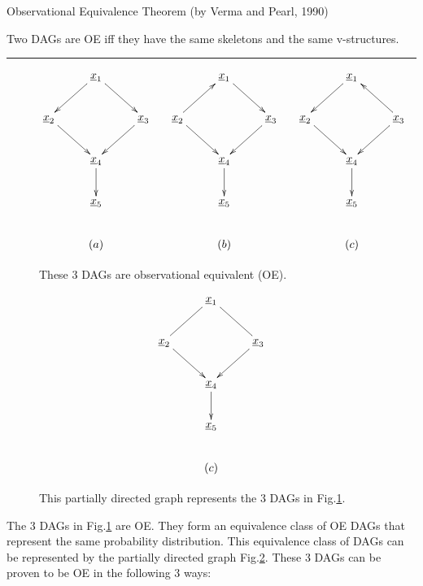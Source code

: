 \begin{claim}Observational Equivalence
Theorem (by Verma and Pearl, 1990)

Two DAGs are
OE
iff they
have the same
skeletons and
the same v-structures.
\end{claim}

\hrule{}

\begin{figure}[h!]
$$\xymatrix{
&\rvx_1
\ar[dl]
\ar[dr]
\\
\rvx_2\ar[dr]
&&\rvx_3\ar[dl]
\\
&\rvx_4\ar[d]
\\
&\rvx_5
\\
&(a)
}
\;\;\;\;\;
\xymatrix{
&\rvx_1
\ar[dr]
\\
\rvx_2\ar[dr]\ar[ur]
&&\rvx_3\ar[dl]
\\
&\rvx_4\ar[d]
\\
&\rvx_5
\\
&(b)
}
\;\;\;\;\;
\xymatrix{
&\rvx_1
\ar[dl]
\\
\rvx_2\ar[dr]
&&\rvx_3\ar[dl]\ar[ul]
\\
&\rvx_4\ar[d]
\\
&\rvx_5
\\
&(c)
}$$
\caption{These 3 DAGs are 
observational equivalent (OE).}
\label{fig-obs-equi-eg}
\end{figure}
\begin{figure}[h!]
$$
\xymatrix{
&\rvx_1
\ar@{-}[dl]\ar@{-}[dr]
\\
\rvx_2\ar[dr]
&&\rvx_3\ar[dl]
\\
&\rvx_4\ar[d]
\\
&\rvx_5
\\
&(c)
}$$
\caption{This partially
directed graph 
represents the 3 
DAGs
in Fig.\ref{fig-obs-equi-eg}.}
\label{fig-pdag1}
\end{figure}

The 3 DAGs
in Fig.\ref{fig-obs-equi-eg}
are OE. They form an equivalence
class of OE DAGs
that represent
the same probability distribution.
This
equivalence
class of DAGs
can be represented
by the partially 
directed graph 
Fig.\ref{fig-pdag1}.
These 3 DAGs 
can be proven to 
be OE
in the following 3 ways:


